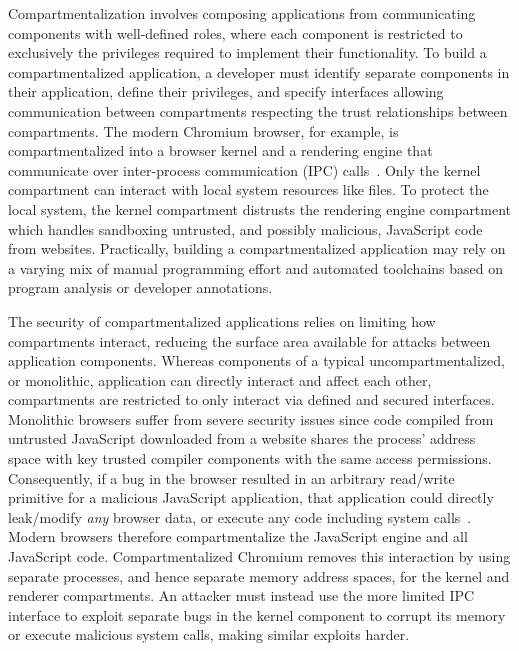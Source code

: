Compartmentalization involves composing applications from communicating 
components with well-defined roles, where each component is restricted to exclusively the 
privileges required to implement their functionality.
To build a compartmentalized application, a developer must identify separate
components in their application, define their privileges, and specify interfaces
allowing communication between compartments respecting the trust relationships
between compartments.
The modern Chromium browser, for example, is compartmentalized into a 
browser kernel and a rendering engine that communicate over 
inter-process communication (IPC) calls~\cite{barth2008security}.
Only the kernel compartment can interact with local system resources like files.
To protect the local system, the kernel compartment distrusts the 
rendering engine compartment which handles sandboxing 
untrusted, and possibly malicious, JavaScript code from websites.
Practically, building a compartmentalized application may rely on a varying mix of
manual programming effort and automated toolchains based on program analysis or
developer annotations.

The security of compartmentalized applications relies on limiting how compartments
interact, reducing the surface area available for attacks between application
components.
Whereas components of a typical uncompartmentalized, or monolithic, application
can directly interact and affect each other, 
compartments are restricted to only interact via defined and secured interfaces.
Monolithic browsers suffer from severe security issues since code 
compiled from untrusted JavaScript downloaded from a website shares the 
process' address space with key trusted compiler components with
the same access permissions.
Consequently, if a bug in the browser resulted in an arbitrary read/write primitive for
a malicious JavaScript application, that application could directly leak/modify
\emph{any} browser data, or 
execute any code including system calls~\cite{ProvosMMWM07, ProvosMRM08}.
Modern browsers therefore compartmentalize the JavaScript engine and all JavaScript code.
Compartmentalized Chromium removes this interaction by using separate processes,
and hence separate memory address spaces, for the kernel and renderer 
compartments.
An attacker must instead use the more limited IPC interface to exploit separate
bugs in the kernel component to corrupt its memory or execute 
malicious system calls, making similar exploits harder.

